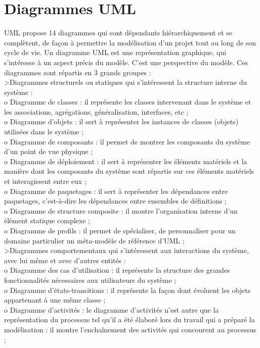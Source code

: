 \section{Diagrammes UML}
UML propose 14 diagrammes qui sont dépendants hiérarchiquement et se complètent, de façon à permettre la modélisation d'un projet tout au long de son cycle de vie. Un diagramme UML est une représentation graphique, qui s'intéresse à un aspect précis du modèle. C'est une perspective du modèle. Ces diagrammes sont répartis en 3 grands groupes : \\
\textgreater Diagrammes structurels ou statiques qui s'intéressent la structure interne du système : \\
o Diagramme de classes : il représente les classes intervenant dans le système et les
associations, agrégations, généralisation, interfaces, etc ;\\
o Diagramme d'objets : il sert à représenter les instances de classes (objets) utilisées dans le système ;\\
o Diagramme de composants : il permet de montrer les composants du système d'un point de vue physique ; \\
o Diagramme de déploiement : il sert à représenter les éléments matériels et la manière dont les composants du système sont répartis sur ces éléments matériels et interagissent entre eux ;\\
o Diagramme de paquetages : il sert à représenter les dépendances entre paquetages, c’est-à-dire les dépendances entre ensembles de définitions ;\\
o Diagramme de structure composite : il montre l’organisation interne d’un élément statique complexe ;\\
o Diagramme de profils : il permet de spécialiser, de personnaliser pour un domaine particulier un méta-modèle de référence d'UML ;\\
\textgreater Diagrammes comportementaux qui s'intéressent aux interactions du système, avec lui même et avec d'autres entités : \\
o Diagramme des cas d'utilisation : il représente la structure des grandes fonctionnalités nécessaires aux utilisateurs du système ;\\ 
o Diagramme d'états-transitions : il représente la façon dont évoluent les objets appartenant à une même classe ; \\
o Diagramme d'activités : le diagramme d'activités n'est autre que la représentation du processus tel qu'il a été élaboré lors du travail qui a préparé la modélisation : il montre l'enchaînement des activités qui concourent au processus ; \\
